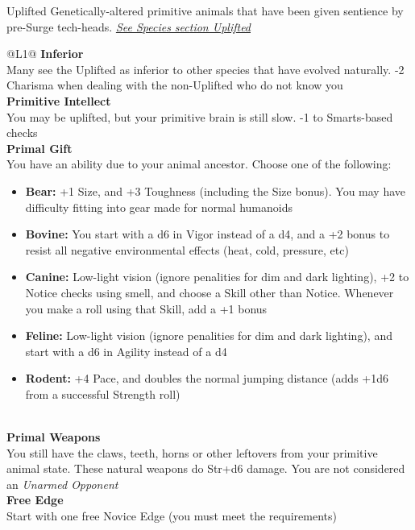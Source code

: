 \begin{genericsection}{Uplifted}
  Genetically-altered primitive animals that have been given sentience by pre-Surge tech-heads. \textit{\hyperref[sec:specie-uplifted]{See Species section Uplifted}}
\end{genericsection}
\begin{redtable}{\linewidth}{@{}L{1}@{}}
  \textbf{Inferior}\\
  Many see the Uplifted as inferior to other species that have evolved naturally. -2 Charisma when dealing with the non-Uplifted who do not know you\\
  \textbf{Primitive Intellect}\\
  You may be uplifted, but your primitive brain is still slow. -1 to Smarts-based checks\\
  \textbf{Primal Gift}\\
  You have an ability due to your animal ancestor. Choose one of the following:
    \begin{itemize}
      \item \textbf{Bear:} +1 Size, and +3 Toughness (including the Size bonus). You may have difficulty fitting into gear made for normal humanoids
      \item \textbf{Bovine:} You start with a d6 in Vigor instead of a d4, and a +2 bonus to resist all negative environmental effects (heat, cold, pressure, etc)
      \item \textbf{Canine:} Low-light vision (ignore penalities for dim and dark lighting), +2 to Notice checks using smell, and choose a Skill other than Notice. Whenever you make a roll using that Skill, add a +1 bonus
      \item \textbf{Feline:} Low-light vision (ignore penalities for dim and dark lighting), and start with a d6 in Agility instead of a d4
      \item \textbf{Rodent:} +4 Pace, and doubles the normal jumping distance (adds +1d6 from a successful Strength roll)
    \end{itemize}\\
  \textbf{Primal Weapons}\\
  You still have the claws, teeth, horns or other leftovers from your primitive animal state. These natural weapons do Str+d6 damage. You are not considered an \textit{Unarmed Opponent}\\
  \textbf{Free Edge}\\
  Start with one free Novice Edge (you must meet the requirements)\\
\end{redtable}
